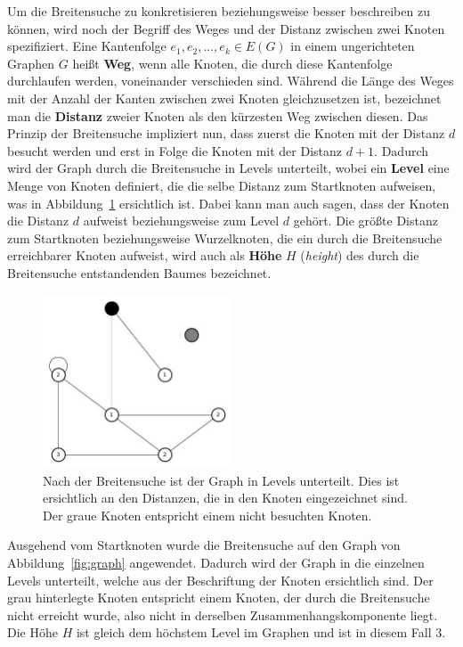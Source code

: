 \documentclass[11pt,a4paper]{article}
\begin{document}
Um die Breitensuche zu konkretisieren beziehungsweise besser beschreiben zu können, wird noch der Begriff des Weges und der Distanz zwischen zwei Knoten spezifiziert. Eine Kantenfolge \(e_{1}, e_{2}, ..., e_{k} \in E(G)\) in einem ungerichteten Graphen \(G\) heißt \textbf{Weg}, wenn alle Knoten, die durch diese Kantenfolge durchlaufen werden, voneinander verschieden sind. Während die Länge des Weges mit der Anzahl der Kanten zwischen zwei Knoten gleichzusetzen ist, bezeichnet man die \textbf{Distanz} zweier Knoten  als den kürzesten Weg zwischen diesen. Das Prinzip der Breitensuche impliziert nun, dass zuerst die Knoten mit der Distanz \(d\) besucht werden und erst in Folge die Knoten mit der Distanz \(d+1\). Dadurch wird der Graph durch die Breitensuche in Levels unterteilt, wobei ein \textbf{Level} eine Menge von Knoten definiert, die die selbe Distanz zum Startknoten aufweisen, was in Abbildung~\ref{fig:graph_level} ersichtlich ist. Dabei kann man auch sagen, dass der Knoten die Distanz \(d\) aufweist beziehungsweise zum Level \(d\) gehört. Die größte Distanz zum Startknoten beziehungsweise Wurzelknoten, die ein durch die Breitensuche erreichbarer Knoten aufweist, wird auch als \textbf{Höhe} \(H\) (\textit{height}) des durch die Breitensuche entstandenden Baumes bezeichnet.\\
\begin{figure}[h]
 	\centering
	\includegraphics[width=0.5\textwidth]{graph_level}
 	\caption{Nach der Breitensuche ist der Graph in Levels unterteilt. Dies ist ersichtlich an den Distanzen, die in den Knoten eingezeichnet sind. Der graue Knoten entspricht einem nicht besuchten Knoten.}
	\label{fig:graph_level}
\end{figure}
Ausgehend vom Startknoten wurde die Breitensuche auf den Graph von Abbildung~\ref{fig:graph} angewendet. Dadurch wird der Graph in die einzelnen Levels unterteilt, welche aus der Beschriftung der Knoten ersichtlich sind. Der grau hinterlegte Knoten entspricht einem Knoten, der durch die Breitensuche nicht erreicht wurde, also nicht in derselben Zusammenhangskomponente liegt. Die Höhe \(H\) ist gleich dem höchstem Level im Graphen und ist in diesem Fall \(3\).
\end{document}
